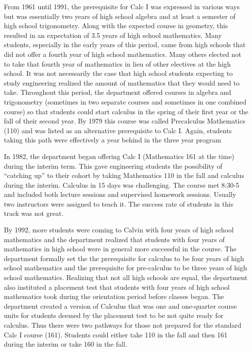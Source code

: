 \documentclass[
]{book}
\begin{document}
From 1961 until 1991, the prerequisite for Calc I was expressed in various ways but was essentially two years of high school algebra and at least a semester of high school trigonometry. Along with the expected course in geometry, this resulted in an expectation of 3.5 years of high school mathematics. Many students, especially in the early years of this period, came from high schools that did not offer a fourth year of high school mathematics. Many others elected not to take that fourth year of mathematics in lieu of other electives at the high school. It was not necessarily the case that high school students expecting to study engineering realized the amount of mathematics that they would need to take. Throughout this period, the department offered courses in algebra and trigonometry (sometimes in two separate courses and sometimes in one combined course) so that students could start calculus in the spring of their first year or the fall of their second year. By 1979 this course was called Precalculus Mathematics (110) and was listed as an alternative prerequisite to Calc I. Again, students taking this path were effectively a year behind in the three year program

In 1982, the department began offering Calc I (Mathematics 161 at the time) during the interim term. This gave engineering students the possibility of ``catching up'' to their cohort by taking Mathematics 110 in the fall and calculus during the interim. Calculus in 15 days was challenging. The course met 8:30-5 and included both lecture sessions and supervised homework sessions. Usually two instructors were assigned to teach it. The success rate of students in this track was not great.

By 1992, more students were coming to Calvin with four years of high school mathematics and the department realized that students with four years of mathematics in high school were in general more successful in the course. The department formally set the the prerequisite for calculus to be four years of high school mathematics and the prerequisite for pre-calculus to be three years of high school mathematics. Realizing that not all high schools are equal, the department also instituted a placement test that students with four years of high school mathematics took during the orientation period before classes began. The department created a version of Calculus that was one and one-quarter course units for students deemed by the placement test to be not quite ready for calculus. Thus there were two pathways for those not prepared for the standard Calc I course (161). Students could either take 110 in the fall and then 161 during the interim or take 160 in the fall.
\end{document}
